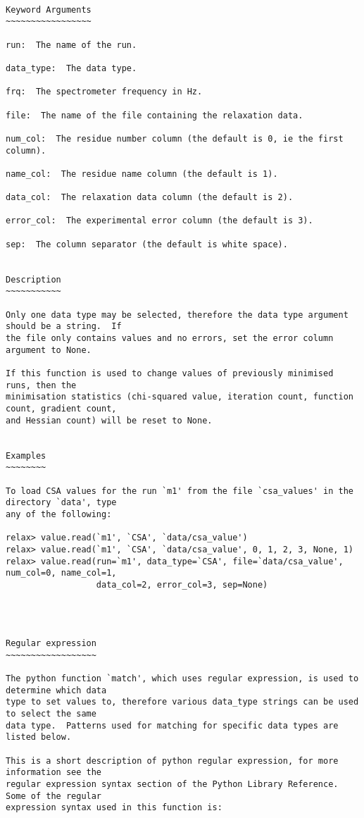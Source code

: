 {\scriptsize
\begin{verbatim}

Keyword Arguments
~~~~~~~~~~~~~~~~~

run:  The name of the run.

data_type:  The data type.

frq:  The spectrometer frequency in Hz.

file:  The name of the file containing the relaxation data.

num_col:  The residue number column (the default is 0, ie the first column).

name_col:  The residue name column (the default is 1).

data_col:  The relaxation data column (the default is 2).

error_col:  The experimental error column (the default is 3).

sep:  The column separator (the default is white space).


Description
~~~~~~~~~~~

Only one data type may be selected, therefore the data type argument should be a string.  If
the file only contains values and no errors, set the error column argument to None.

If this function is used to change values of previously minimised runs, then the
minimisation statistics (chi-squared value, iteration count, function count, gradient count,
and Hessian count) will be reset to None.


Examples
~~~~~~~~

To load CSA values for the run `m1' from the file `csa_values' in the directory `data', type
any of the following:

relax> value.read(`m1', `CSA', `data/csa_value')
relax> value.read(`m1', `CSA', `data/csa_value', 0, 1, 2, 3, None, 1)
relax> value.read(run=`m1', data_type=`CSA', file=`data/csa_value', num_col=0, name_col=1,
                  data_col=2, error_col=3, sep=None)




Regular expression
~~~~~~~~~~~~~~~~~~

The python function `match', which uses regular expression, is used to determine which data
type to set values to, therefore various data_type strings can be used to select the same
data type.  Patterns used for matching for specific data types are listed below.

This is a short description of python regular expression, for more information see the
regular expression syntax section of the Python Library Reference.  Some of the regular
expression syntax used in this function is:


\end{verbatim}}
